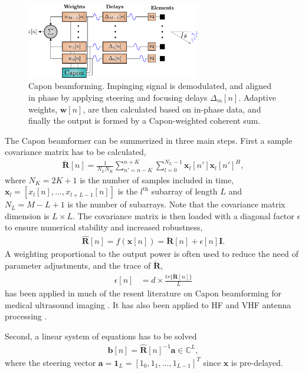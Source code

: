 \documentclass[12pt,journal,onecolumn]{IEEEtran}
\newcommand{\mat}[1]{\mathbf{#1}}
\renewcommand{\vec}[1]{\mathbf{#1}}
\begin{document}
\begin{figure}
\centerline{\includegraphics[width=3in]{gfx/beamforming_mv.pdf}}
\caption{Capon beamforming. Impinging signal is demodulated, and aligned in phase by applying steering and focusing delays $\Delta_m[n]$. Adaptive weights, $\vec{w}[n]$, are then calculated based on in-phase data, and finally the output is formed by a Capon-weighted coherent sum.}
\label{fig:mvbf}
\end{figure}

The Capon beamformer can be summerized in three main steps. First a sample covariance matrix has to be calculated, 
\begin{align}
\mat{\breve{R}}[n] = \frac{1}{N_LN_K}\sum_{n'=n-K}^{n+K} \sum_{l=0}^{N_L-1} \vec{x}_l[n']\vec{x}_l[n']^H,\label{eq:R}
\end{align}
where  $N_K = 2K + 1$ is the number of samples included in time, $\vec{x}_l = [x_l[n], \dotso, x_{l+L-1}[n]]$ is the $l^\text{th}$ subarray of length $L$ and $N_L = M-L+1$ is the number of subarrays. Note that the covariance matrix dimension is $L \times L$. The covariance matrix is then loaded with a diagonal factor $\epsilon$ to ensure numerical stability and increased robustness, 
\begin{align}\label{eq:diag}
\mat{\hat{R}}[n] =  f(\vec{x}[n]) = \mat{\breve{R}}[n] + \epsilon[n]\mat{I}.
\end{align}
A weighting proportional to the output power is often used to reduce the need of parameter adjustments, and the trace of $\mat{\breve{R}}$, 
\begin{align}\label{eq:diag_adapt}
\epsilon[n] &= d \times \frac{tr\{\mat{\breve{R}}[n]\}}{L}
\end{align}
has been applied in much of the resent literature on Capon beamforming for medical ultrasound imaging \cite{Synnevag2007, Nilsen2009, Wang2009, Mehdizadeh2012}. It has also been applied to HF and VHF antenna processing \cite{Featherstone1997b}.

Second, a linear system of equations has to be solved
\begin{align}\label{eq:b}
\vec{b}[n] = \mat{\hat{R}}[n]^{-1}\vec{a} \in \mathbb{C}^L,
\end{align}
where the steering vector $\vec{a} = \vec{1}_L = [1_0, 1_1, ..., 1_{L-1}]^T$ since $\vec{x}$ is pre-delayed. 
\end{document}
